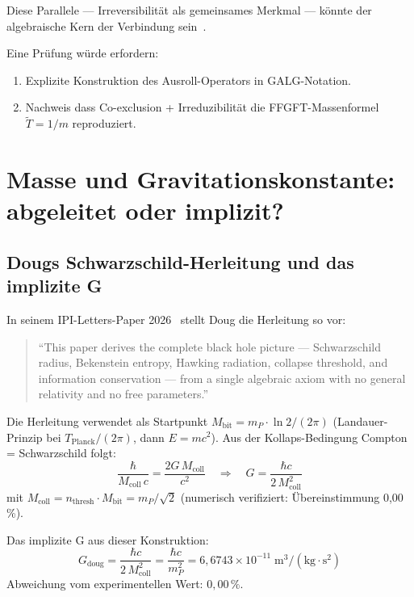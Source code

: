 Diese Parallele --- Irreversibilität als gemeinsames Merkmal ---
könnte der algebraische Kern der Verbindung sein~\SM.

Eine Prüfung würde erfordern:
\begin{enumerate}
  \item Explizite Konstruktion des Ausroll-Operators in GALG-Notation.
  \item Nachweis dass Co-exclusion + Irreduzibilität
    die FFGFT-Massenformel $\tilde{T}=1/m$ reproduziert.
\end{enumerate}

\section{Masse und Gravitationskonstante: abgeleitet oder implizit?}

\subsection{Dougs Schwarzschild-Herleitung und das implizite G}

In seinem IPI-Letters-Paper 2026~\cite{Matzke2026IPI} stellt Doug die Herleitung so vor:
\begin{quote}
``This paper derives the complete black hole picture ---
Schwarzschild radius, Bekenstein entropy, Hawking radiation,
collapse threshold, and information conservation --- from a single
algebraic axiom with no general relativity and no free parameters.''
\end{quote}

Die Herleitung verwendet als Startpunkt
$M_\text{bit} = m_P \cdot \ln 2 / (2\pi)$
(Landauer-Prinzip bei $T_\text{Planck}/(2\pi)$, dann $E = mc^2$).
Aus der Kollaps-Bedingung Compton = Schwarzschild folgt:
\begin{equation}
  \frac{\hbar}{M_\text{coll}\,c} = \frac{2G\,M_\text{coll}}{c^2}
  \quad\Rightarrow\quad
  G = \frac{\hbar c}{2\,M_\text{coll}^2}
\end{equation}
mit $M_\text{coll} = n_\text{thresh}\cdot M_\text{bit} = m_P/\sqrt{2}$
(numerisch verifiziert: Übereinstimmung 0{,}00\,\%).

Das implizite G aus dieser Konstruktion:
\begin{equation}
  G_\text{doug} = \frac{\hbar c}{2\,M_\text{coll}^2}
  = \frac{\hbar c}{m_P^2}
  = 6{,}6743\times10^{-11}\;\text{m}^3/(\text{kg}\cdot\text{s}^2)
\end{equation}
Abweichung vom experimentellen Wert: $0{,}00\,\%$.

